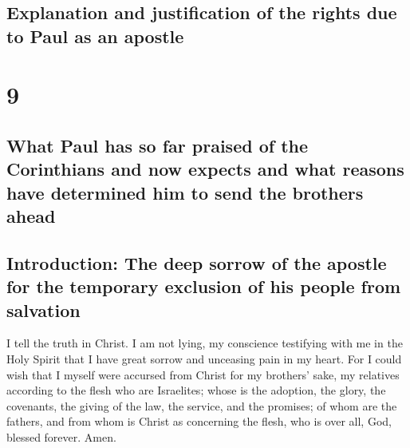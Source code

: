 \begin{paracol}{2}
\switchcolumn
\begin{otherlanguage}{english}

\hypertarget{explanation-and-justification-of-the-rights-due-to-paul-as-an-apostle}{%
\subsection{Explanation and justification of the rights due to Paul as
an
apostle}\label{explanation-and-justification-of-the-rights-due-to-paul-as-an-apostle}}

\hypertarget{section-17}{%
\section{9}\label{section-17}}

\hypertarget{what-paul-has-so-far-praised-of-the-corinthians-and-now-expects-and-what-reasons-have-determined-him-to-send-the-brothers-ahead}{%
\subsection{What Paul has so far praised of the Corinthians and now
expects and what reasons have determined him to send the brothers
ahead}\label{what-paul-has-so-far-praised-of-the-corinthians-and-now-expects-and-what-reasons-have-determined-him-to-send-the-brothers-ahead}}

\hypertarget{introduction-the-deep-sorrow-of-the-apostle-for-the-temporary-exclusion-of-his-people-from-salvation}{%
\subsection{Introduction: The deep sorrow of the apostle for the
temporary exclusion of his people from
salvation}\label{introduction-the-deep-sorrow-of-the-apostle-for-the-temporary-exclusion-of-his-people-from-salvation}}

 I tell the truth in Christ. I am not lying, my conscience
testifying with me in the Holy Spirit  that I have great
sorrow and unceasing pain in my heart.  For I could wish
that I myself were accursed from Christ for my brothers' sake, my
relatives according to the flesh  who are Israelites;
whose is the adoption, the glory, the covenants, the giving of the law,
the service, and the promises;  of whom are the fathers,
and from whom is Christ as concerning the flesh, who is over all, God,
blessed forever. Amen.


\end{otherlanguage}
\end{paracol}
